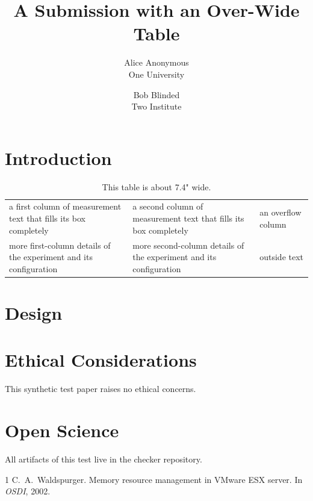 \documentclass[letterpaper,twocolumn,10pt]{article}
\date{}
\title{\Large \bf A Submission with an Over-Wide Table}
\author{{\rm Alice Anonymous}\\One University \and {\rm Bob Blinded}\\Two Institute}
\begin{document}
\maketitle

\begin{abstract}
\lipsum[1][1-5]
\end{abstract}

\section{Introduction}
\lipsum[2-3]

\begin{table}[t]
  \begin{tabular}{p{3.2in}p{3.2in}p{0.8in}}
    a first column of measurement text that fills its box completely &
    a second column of measurement text that fills its box completely &
    an overflow column \\
    more first-column details of the experiment and its configuration &
    more second-column details of the experiment and its configuration &
    outside text \\
  \end{tabular}
  \caption{This table is about 7.4" wide.}
  \label{tab:wide}
\end{table}

\section{Design}
\lipsum[4-6]

\appendix
\section*{Ethical Considerations}
This synthetic test paper raises no ethical concerns.

\section*{Open Science}
All artifacts of this test live in the checker repository.

\begin{thebibliography}{1}
 C.~A.\ Waldspurger. Memory resource management in VMware ESX
  server. In \emph{OSDI}, 2002.
\end{thebibliography}
\end{document}
